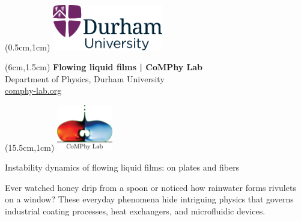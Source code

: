 \documentclass[11pt]{article}
\newlength{\headertobodysep}
\begin{document}
\thispagestyle{empty}

\textblockorigin{0pt}{0pt}

\begin{textblock*}{5cm}(0.5cm,1cm)
    \includegraphics[height=2cm]{../_logosAndRef/Durham-University.pdf}
\end{textblock*}

\begin{textblock*}{9cm}(6cm,1.5cm)
    \centering
    {\large \textbf{Flowing liquid films | CoMPhy Lab}}\\[0.2em]
    Department of Physics, Durham University\\[0.3em]
    \href{https://comphy-lab.org}{comphy-lab.org}
\end{textblock*}

\begin{textblock*}{5cm}(15.5cm,1cm) %
    \includegraphics[height=2cm]{../_logosAndRef/CoMPhy-Lab.png}
\end{textblock*}

\vspace*{\headertobodysep}

\begin{center}
    \begin{LARGE}
     Instability dynamics of flowing liquid films: on plates and fibers
    \end{LARGE}
\end{center}

\noindent Ever watched honey drip from a spoon or noticed how rainwater forms rivulets on a window? These everyday phenomena hide intriguing physics that governs industrial coating processes, heat exchangers, and microfluidic devices.
\end{document}
